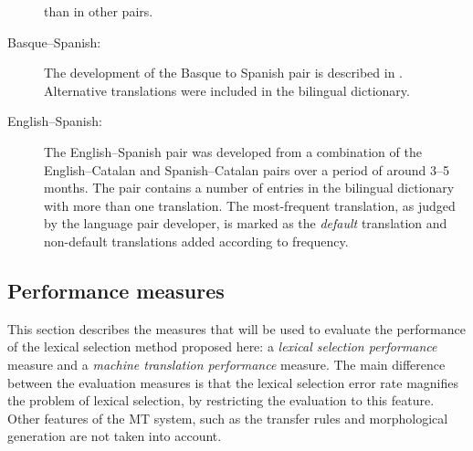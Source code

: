 \documentclass[11pt]{article}
\newcommand{\comment}[1]{\todo{#1}}
\begin{document}
\begin{description}
than in other pairs.  
\item[Basque--Spanish:] The development of the Basque to Spanish pair
  is described in \cite{ginesti09}. 
  Alternative translations were included in the bilingual
  dictionary.%

\item[English--Spanish:] The English--Spanish pair was developed from
  a combination of the English--Catalan and Spanish--Catalan pairs
  over a period of around 3--5 months. The pair 
  contains a number of entries in the bilingual dictionary with
  more than one translation. The most-frequent translation, as judged
  by the language pair developer, is marked as the \emph{default}
  translation and non-default translations added according to
  frequency. 
\end{description}


\subsection{Performance measures}
\label{ss:measures}

This section describes the measures that will be used to evaluate the
performance of the lexical selection method proposed here: a
\emph{lexical selection performance} measure and a \emph{machine
  translation performance} measure. The main difference between the
evaluation measures is that the lexical selection error rate magnifies
the problem of lexical selection, by restricting the evaluation to
this feature. Other features of the MT system, such as the transfer rules
and morphological generation are not taken into account.
\end{document}
